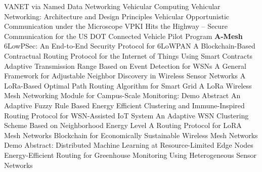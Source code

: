  \cite{grassi_vanet_2014} {{VANET}} via {{Named Data Networking}} \newline 
 \cite{gerla_vehicular_2012} Vehicular {{ Computing}} \newline 
 \cite{lee_vehicular_2014} Vehicular  Networking: Architecture and Design Principles \newline 
 \cite{hadaller_vehicular_2007} Vehicular Opportunistic Communication under the Microscope \newline 
 \cite{weil_vpki_2017} {{VPKI Hits}} the {{Highway}} – {{Secure Communication}} for the {{US DOT Connected Vehicle Pilot Program}} \newline 
\textbf{A-Mesh} \newline  \cite{glissa_6lowpsec_2019} {{6LowPSec}}: {{An}} End-to-End Security Protocol for {{6LoWPAN}} \newline 
 \cite{ramezan_blockchain-based_2018} A {{Blockchain}}-{{Based Contractual Routing Protocol}} for the {{Internet}} of {{Things Using Smart Contracts}} \newline 
 \cite{wannachai_adaptive_2015} Adaptive {{Transmission Range Based}} on {{Event Detection}} for {{WSNs}} \newline 
 \cite{gu_general_2019} A {{General Framework}} for {{Adjustable Neighbor Discovery}} in {{Wireless Sensor Networks}} \newline 
 \cite{huang_lorabased_2018} A {{LoRa}}-{{Based Optimal Path Routing Algorithm}} for {{Smart Grid}} \newline 
 \cite{ke_lora_2017} A {{LoRa}} Wireless Mesh Networking Module for Campus-Scale Monitoring: Demo Abstract \newline 
 \cite{preeth_adaptive_2018} An Adaptive Fuzzy Rule Based Energy Efficient Clustering and Immune-Inspired Routing Protocol for {{WSN}}-Assisted {{IoT}} System \newline 
 \cite{yan_adaptive_2017} An Adaptive {{WSN}} Clustering Scheme Based on Neighborhood Energy Level \newline 
 \cite{lundell_routing_2018} A {{Routing Protocol}} for {{LoRA Mesh Networks}} \newline 
 \cite{kabbinale_blockchain_2018} Blockchain for {{Economically Sustainable Wireless Mesh Networks}} \newline 
 \cite{tuor_demo_2018} Demo Abstract: {{Distributed}} Machine Learning at Resource-Limited Edge Nodes \newline 
 \cite{behera_energy-efficient_2019} Energy-{{Efficient Routing}} for {{Greenhouse Monitoring Using Heterogeneous Sensor Networks}} \newline 
